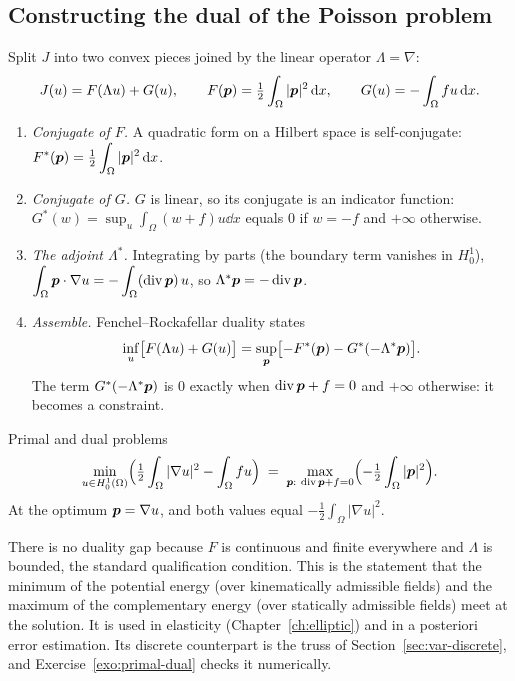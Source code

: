 \subsection{Constructing the dual of the Poisson problem}
%
Split $J$ into two convex pieces joined by the linear operator
$\Lambda=\nabla$:
\[
  J(u)=F(\Lambda u)+G(u),\qquad
  F(\bm{p})=\tfrac12\int_\Omega|\bm{p}|^2\,\mathrm{d} x,\qquad
  G(u)=-\int_\Omega fu\,\mathrm{d} x .
\]
\begin{enumerate}[label=\emph{Step \arabic*.},leftmargin=*,itemsep=3pt]
\item \emph{Conjugate of $F$.} A quadratic form on a Hilbert space is
self-conjugate: $\displaystyle F^\ast(\bm{p})=\tfrac12\int_\Omega|\bm{p}|^2\,\mathrm{d} x$.
\item \emph{Conjugate of $G$.} $G$ is linear, so its conjugate is an
indicator function:
$\displaystyle G^\ast(w)=\sup_u\int_\Omega(w+f)u\dd x$ equals $0$ if $w=-f$ and $+\infty$
otherwise.
\item \emph{The adjoint $\Lambda^\ast$.} Integrating by parts (the boundary
term vanishes in $H^1_0$), $\displaystyle \int_\Omega\bm{p}\cdot\nabla u=-\int_\Omega(\operatorname{div}\bm{p})\,u$,
so $\Lambda^\ast\bm{p}=-\operatorname{div}\bm{p}$.
\item \emph{Assemble.} Fenchel--Rockafellar duality states
\[
  \inf_u\bigl[F(\Lambda u)+G(u)\bigr]
  =\sup_{\bm{p}}\bigl[-F^\ast(\bm{p})-G^\ast(-\Lambda^\ast\bm{p})\bigr].
\]
The term $G^\ast(-\Lambda^\ast\bm{p})$ is $0$ exactly when $\operatorname{div}\bm{p}+f=0$ and
$+\infty$ otherwise: it becomes a constraint.
\end{enumerate}

\begin{gbox}{Primal and dual problems}
%
\[
  \min_{u\in H^1_0(\Omega)}\Bigl(\tfrac12\int_\Omega|\nabla u|^2-\int_\Omega fu\Bigr)
  \;=\;
  \max_{\vp:\ \dive\vp+f=0}\Bigl(-\tfrac12\int_\Omega|\vp|^2\Bigr).
\]
At the optimum $\bm{p}=\nabla u$, and both values equal $\displaystyle -\tfrac12\int_\Omega|\nabla u|^2$.
\end{gbox}
There is no duality gap because $F$ is continuous and finite everywhere and
$\Lambda$ is bounded, the standard qualification condition. This is the
statement that the minimum of the potential energy (over kinematically
admissible fields) and the maximum of the complementary energy (over
statically admissible fields) meet at the solution. It is used in elasticity
(Chapter~\ref{ch:elliptic}) and in a posteriori error estimation. Its
discrete counterpart is the truss of Section~\ref{sec:var-discrete}, and
Exercise~\ref{exo:primal-dual} checks it numerically.

